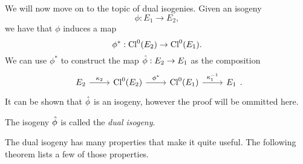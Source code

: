 We will now move on to the topic of dual isogenies. Given an isogeny
\begin{equation*}
	\phi: E_1 \to E_2,
\end{equation*}
we have that $\phi$ induces a map
\begin{equation*}
	\phi^*: \operatorname{Cl}^0(E_2) \to \operatorname{Cl}^0(E_1).
\end{equation*}
We can use $\phi^*$ to construct the map $\Hat\phi: E_2 \to E_1$
as the composition
\begin{equation*}
	\begin{tikzcd}
		{E_2} & {\Cl^0(E_2)} & {\Cl^0(E_1)} & {E_1}
		\arrow["{\kappa_2}", from=1-1, to=1-2]
		\arrow["{\phi^*}", from=1-2, to=1-3]
		\arrow["{\kappa_1^{-1}}", from=1-3, to=1-4]
	\end{tikzcd}.
\end{equation*}
It can be shown that $\Hat\phi$ is an isogeny, however the proof will be
ommitted here.

\begin{definition}
	The isogeny $\Hat\phi$ is called the \emph{dual isogeny}.
\end{definition}

The dual isogeny has many properties that make it quite useful.
The following theorem lists a few of those properties.


